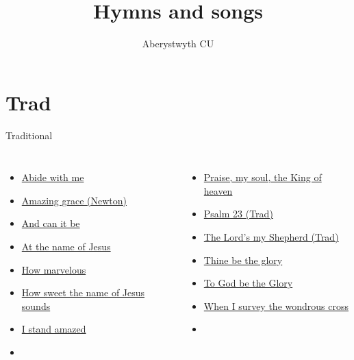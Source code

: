 \documentclass[aspectratio=169]{beamer}
\title{Hymns and songs}
\author{Aberystwyth CU}
\date{}
\begin{document}
\maketitle

\section{ Trad }

\begin{frame}[t]{Traditional}
\begin{columns}[t]
\begin{itemize}
    \item \hyperlink{Abide with me[]}{Abide with me}

    \item \hyperlink{Amazing grace[](Newton)}{Amazing grace (Newton)}

    \item \hyperlink{And can it be[]}{And can it be}

    \item \hyperlink{At the name of Jesus[]}{At the name of Jesus}

    \item \hyperlink{I stand amazed['How marvelous']}{How marvelous}

    \item \hyperlink{How sweet the name of Jesus sounds[]}{How sweet the name of Jesus sounds}

    \item \hyperlink{I stand amazed['How marvelous']}{I stand amazed}

    \item[] \phantom{1}
\end{itemize}
\begin{itemize}
    \item \hyperlink{Praise, my soul, the King of heaven[]}{Praise, my soul, the King of heaven}

    \item \hyperlink{The Lord's my Shepherd['Psalm 23'](Trad)}{Psalm 23 (Trad)}

    \item \hyperlink{The Lord's my Shepherd['Psalm 23'](Trad)}{The Lord's my Shepherd (Trad)}

    \item \hyperlink{Thine be the glory[]}{Thine be the glory}

    \item \hyperlink{To God be the Glory[]}{To God be the Glory}

    \item \hyperlink{When I survey the wondrous cross[](Watts)}{When I survey the wondrous cross}

    \item[] \phantom{1}
\end{itemize}
\end{columns}
\end{frame}
\end{document}
